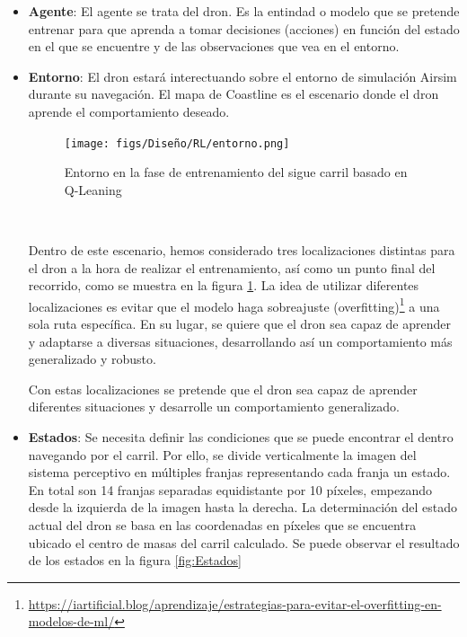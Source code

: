   \begin{itemize} 
    \item \textbf{Agente}: El agente se trata del dron. Es la entindad o modelo que se pretende entrenar para que aprenda a tomar decisiones (acciones) en función del estado en el que se 
    encuentre y de las observaciones que vea en el entorno. 
    
    \item \textbf{Entorno}: El dron estará interectuando sobre el entorno de simulación Airsim durante su navegación. El mapa de Coastline es el escenario donde el dron aprende 
    el comportamiento deseado. 
    \begin{figure} [H]
      \begin{center}
        \texttt{[image: figs/Diseño/RL/entorno.png]}
      \end{center}
      \caption{Entorno en la fase de entrenamiento del sigue carril basado en Q-Leaning}
      \label{fig:Entorno}
    \end{figure}\

    Dentro de este escenario, hemos considerado tres localizaciones distintas para el dron a la hora de realizar el entrenamiento, así como un punto final del recorrido, como se muestra en la figura
    \ref{fig:Entorno}. La idea de utilizar diferentes localizaciones es evitar que el modelo haga sobreajuste (overfitting)\footnote{\url{https://iartificial.blog/aprendizaje/estrategias-para-evitar-el-overfitting-en-modelos-de-ml/}} 
    a una sola ruta específica. En su lugar, se quiere que el dron 
    sea capaz de aprender y adaptarse a diversas situaciones, desarrollando así un comportamiento más generalizado y robusto.
    
    
    Con estas localizaciones se pretende que el dron sea capaz de aprender diferentes situaciones y desarrolle un comportamiento generalizado. 
    \item \textbf{Estados}: Se necesita definir las condiciones que se puede encontrar el dentro navegando por el carril. Por ello, se divide verticalmente la imagen del sistema perceptivo
    en múltiples franjas representando cada franja un estado. En total son 14 franjas separadas equidistante por 10 píxeles, empezando desde la izquierda de la imagen hasta la derecha. La determinación
    del estado actual del dron se basa en las coordenadas en píxeles que se encuentra ubicado el centro de masas del carril calculado. Se puede observar el 
    resultado de los estados en la figura \ref{fig:Estados}
    

\end{itemize}
